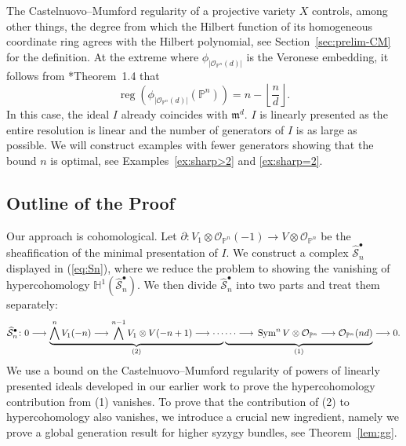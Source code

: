 \documentclass[11pt,letterpaper,reqno]{amsart}
\newcommand{\m}{\mathfrak{m}}
\newcommand{\Sym}{\operatorname{Sym}}
\newcommand{\reg}{\operatorname{reg}}
\newcommand{\mc}[1]{\mathcal{#1}}
\def\PP{{\mathbb P}}
\def\lra{\longrightarrow}
\theoremstyle{definition}
\numberwithin{equation}{section}
\begin{document}
\noindent
The Castelnuovo--Mumford regularity of a projective variety $X$ controls, among other things, the degree from which the Hilbert function of its homogeneous coordinate ring agrees with the Hilbert polynomial, see Section~\ref{sec:prelim-CM} for the definition. At the extreme where $\phi_{|\mc{O}_{\PP^n}(d)|}$ is the Veronese embedding, it follows from \cite{CM}*{Theorem~1.4} that
\[\reg\left(\phi_{|\mc{O}_{\PP^n}(d)|} (\PP^n)\right) = n - \left\lfloor \frac{n}{d}\right \rfloor.\]
In this case, the ideal $I$ already coincides with $\m^d$. $I$ is linearly presented as the entire resolution is linear and the number of generators of $I$ is as large as possible. We will construct examples with fewer generators showing that the bound $n$ is optimal, see Examples~\ref{ex:sharp>2} and \ref{ex:sharp=2}.
\subsection*{Outline of the Proof} Our approach is cohomological. Let $\partial \colon V_1 \otimes \mc{O}_{\PP^n}(-1) \lra V \otimes \mc{O}_{\PP^n}$ be the sheafification of the minimal presentation of $I$. We construct a complex $\widehat{\mc{S}}^\bullet_n$ displayed in (\ref{eq:Sn}), where we reduce the problem to showing the vanishing of hypercohomology $\mathbb{H}^1\left( \widehat{\mc{S}}^\bullet_n\right)$. We then divide $\widehat{\mc{S}}^ \bullet_n$ into two parts and treat them separately:
\begin{equation}\label{eq:Sn}
    \widehat{\mathcal S}_n^{\bullet} \colon
0 \lra
\underbrace{
\bigwedge^{n} V_1(-n) \lra \bigwedge^{n-1} V_1 \otimes V(-n+1) 
\lra \cdots
}_{(2)}
\underbrace{\cdots\lra \vphantom{\bigwedge^n}
\Sym^{n}V \otimes \mathcal O_{\mathbb P^n}
\lra
\mathcal O_{\mathbb P^n}(nd) 
}_{(1)} \lra 0.
\end{equation}
We use a bound on the Castelnuovo--Mumford regularity of powers of linearly presented ideals developed in our earlier work \cite{yang} to prove the hypercohomology contribution from (1) vanishes. To prove that the contribution of (2) to hypercohomology also vanishes, we introduce a crucial new ingredient, namely we prove a global generation result for higher syzygy bundles, see Theorem~\ref{lem:gg}.
\end{document}
